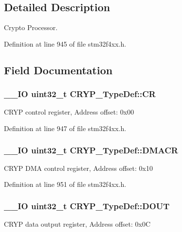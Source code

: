 \subsection{Detailed Description}
Crypto Processor. 

Definition at line 945 of file stm32f4xx.\-h.



\subsection{Field Documentation}
\hypertarget{struct_c_r_y_p___type_def_a65da2a40a06c5c391cbe346dbaa5380c}{
\subsubsection[{C\-R}]{\setlength{\rightskip}{0pt plus 5cm}\-\_\-\-\_\-\-I\-O {\bf uint32\-\_\-t} C\-R\-Y\-P\-\_\-\-Type\-Def\-::\-C\-R}}\label{struct_c_r_y_p___type_def_a65da2a40a06c5c391cbe346dbaa5380c}
C\-R\-Y\-P control register, Address offset\-: 0x00 

Definition at line 947 of file stm32f4xx.\-h.

\hypertarget{struct_c_r_y_p___type_def_ad525241894427fc83a16e3370bb5b1d8}{
\subsubsection[{D\-M\-A\-C\-R}]{\setlength{\rightskip}{0pt plus 5cm}\-\_\-\-\_\-\-I\-O {\bf uint32\-\_\-t} C\-R\-Y\-P\-\_\-\-Type\-Def\-::\-D\-M\-A\-C\-R}}\label{struct_c_r_y_p___type_def_ad525241894427fc83a16e3370bb5b1d8}
C\-R\-Y\-P D\-M\-A control register, Address offset\-: 0x10 

Definition at line 951 of file stm32f4xx.\-h.

\hypertarget{struct_c_r_y_p___type_def_a0b3e1f1551d11a01f7b2356e91281e7d}{
\subsubsection[{D\-O\-U\-T}]{\setlength{\rightskip}{0pt plus 5cm}\-\_\-\-\_\-\-I\-O {\bf uint32\-\_\-t} C\-R\-Y\-P\-\_\-\-Type\-Def\-::\-D\-O\-U\-T}}\label{struct_c_r_y_p___type_def_a0b3e1f1551d11a01f7b2356e91281e7d}
C\-R\-Y\-P data output register, Address offset\-: 0x0\-C 

